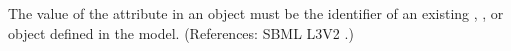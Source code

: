 The value of the attribute  in an \InitialAssignment object
must be the identifier of an existing \Compartment, \Species,
\Parameter or \SpeciesReference object defined in the model.  (References:
SBML L3V2 .)
